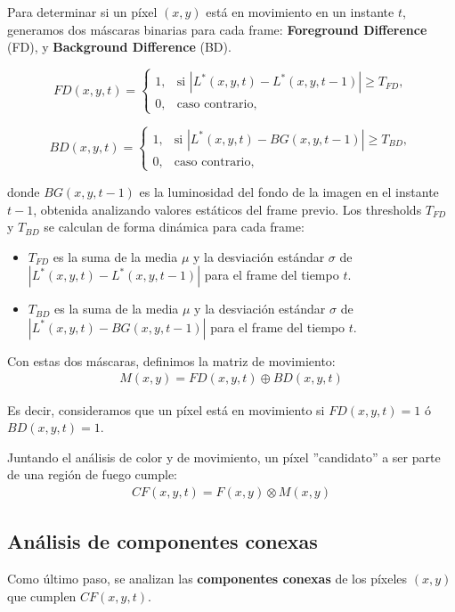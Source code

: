 \documentclass[a4paper]{article}
\begin{document}
Para determinar si un píxel $(x,y)$ está en movimiento en un instante $t$, generamos dos máscaras binarias para cada frame: \textbf{Foreground Difference} (FD), y \textbf{Background Difference} (BD).

\[
FD(x,y,t) = 
\begin{cases}
    1, & \text{si } \left| L^*(x,y,t) - L^*(x,y,t-1) \right| \geq T_{FD}, \\
    0, & \text{caso contrario,}
\end{cases}
\]

\[
BD(x,y,t) = 
\begin{cases}
    1, & \text{si } \left| L^*(x,y,t) - BG(x,y,t-1) \right| \geq T_{BD}, \\
    0, & \text{caso contrario,}
\end{cases}
\]

donde $BG(x,y,t-1)$ es la luminosidad del fondo de la imagen en el instante $t-1$, obtenida analizando valores estáticos del frame previo. Los thresholds $T_{FD}$ y $T_{BD}$ se calculan de forma dinámica para cada frame:
\begin{itemize}
    \item $T_{FD}$ es la suma de la media $\mu$ y la desviación estándar $\sigma$ de $\left| L^*(x,y,t) - L^*(x,y,t-1) \right|$ para el frame del tiempo $t$.

    \item $T_{BD}$ es la suma de la media $\mu$ y la desviación estándar $\sigma$ de $\left| L^*(x,y,t) - BG(x,y,t-1) \right|$ para el frame del tiempo $t$.
\end{itemize}

Con estas dos máscaras, definimos la matriz de movimiento:
\begin{align*}
    M(x,y) = FD(x,y,t) \oplus BD(x,y,t)
\end{align*}

Es decir, consideramos que un píxel está en movimiento si $FD(x,y,t) = 1$ ó $BD(x,y,t) = 1$. 

Juntando el análisis de color y de movimiento, un píxel ''candidato'' a ser parte de una región de fuego cumple:
\begin{align*}
    CF(x,y,t) = F(x,y) \otimes M(x,y)
\end{align*}

\subsection{Análisis de componentes conexas}
Como último paso, se analizan las \textbf{componentes conexas} de los píxeles $(x,y)$ que cumplen $CF(x,y,t)$.
\end{document}
